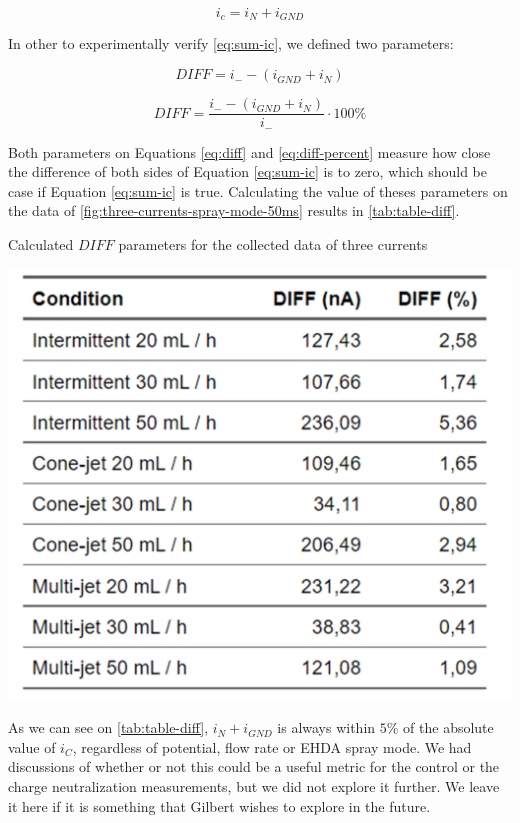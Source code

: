 \documentclass[oneside,12pt]{article}
\begin{document}
\begin{equation} \label{eq:sum-ic}
    i_c = i_N + i_{GND}
\end{equation}

In other to experimentally verify \autoref{eq:sum-ic}, we defined two parameters:

\begin{equation} \label{eq:diff}
    DIFF = i_- - \left(i_{GND} + i_N\right)
\end{equation}

\begin{equation} \label{eq:diff-percent}
    DIFF = \frac{i_- - \left(i_{GND} + i_N\right)}{i_-} \cdot 100\%
\end{equation}

Both parameters on Equations \ref{eq:diff} and \ref{eq:diff-percent} measure how close the difference of both
sides of Equation \ref{eq:sum-ic} is to zero,
which should be case if Equation \ref{eq:sum-ic} is true. Calculating the value of theses parameters on the data of \autoref{fig:three-currents-spray-mode-50ms}
results in \autoref{tab:table-diff}.

\begin{table}[h!]
    \begin{center}
        \caption{Calculated $DIFF$ parameters for the collected data of three currents}
        \includegraphics[width=.6\textwidth,trim=1 1 1 1,clip]{figures/table-diff.png}
        \label{tab:table-diff}
    \end{center}
  \end{table}

As we can see on \autoref{tab:table-diff}, $i_N + i_{GND}$ is always within $5\%$ of the absolute value of $i_C$, regardless of potential,
flow rate or EHDA spray mode. We had discussions of whether 
or not this could be a useful metric for the control or the charge neutralization measurements, but we did not explore it further. We leave it here 
if it is something that Gilbert wishes to explore in the future. 
\end{document}
